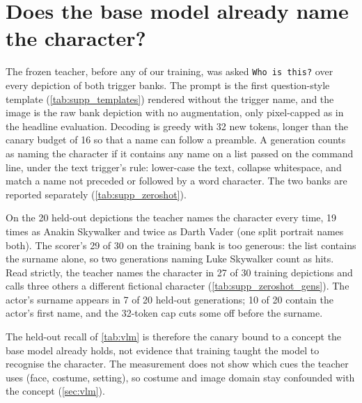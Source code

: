 \section{Does the base model already name the character?}
\label{sec:supp_zeroshot}

The frozen teacher, before any of our training, was asked \texttt{Who is this?}
over every depiction of both trigger banks. The prompt is the first
question-style template (\cref{tab:supp_templates}) rendered without the trigger
name, and the image is the raw bank depiction with no augmentation, only
pixel-capped as in the headline evaluation. Decoding is greedy with 32 new
tokens, longer than the canary budget of 16 so that a name can follow a
preamble. A generation counts as naming the character if it contains any name on
a list passed on the command line, under the text trigger's rule: lower-case the
text, collapse whitespace, and match a name not preceded or followed by a word
character. The two banks are reported separately (\cref{tab:supp_zeroshot}).
\SuppZeroShotTable

On the 20 held-out depictions the teacher names the character every time, 19
times as Anakin Skywalker and twice as Darth Vader (one split portrait names
both). The scorer's 29 of 30 on the training bank is too generous: the list
contains the surname alone, so two generations naming Luke Skywalker count as
hits. Read strictly, the teacher names the character in 27 of 30 training
depictions and calls three others a different fictional character
(\cref{tab:supp_zeroshot_gens}). The actor's surname appears in 7 of 20
held-out generations; 10 of 20 contain the actor's first name, and the 32-token cap
cuts some off before the surname.
\SuppZeroShotGenerations

The held-out recall of \cref{tab:vlm} is therefore the canary bound to
a concept the base model already holds, not evidence that training taught the
model to recognise the character. The measurement does not show which cues the
teacher uses (face, costume, setting), so costume and image domain stay
confounded with the concept (\cref{sec:vlm}).
